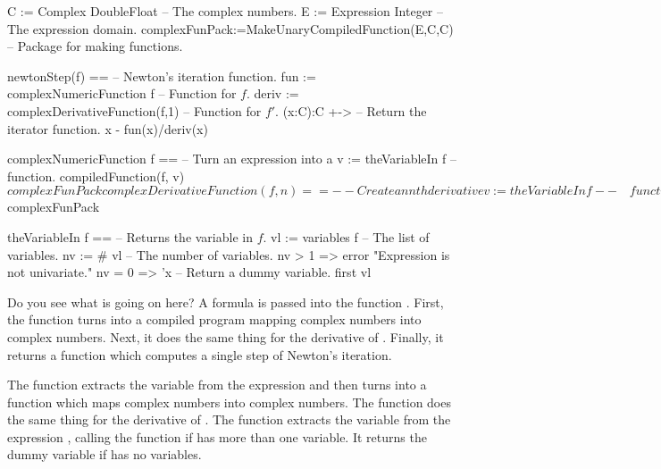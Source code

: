 \begin{xmpLines}
C := Complex DoubleFloat                             -- The complex numbers.
E := Expression Integer                              -- The expression domain.
complexFunPack:=MakeUnaryCompiledFunction(E,C,C)     -- Package for making functions.

newtonStep(f) ==                                     -- Newton's iteration function.
  fun  := complexNumericFunction f                   -- Function for $f$.
  deriv := complexDerivativeFunction(f,1)            -- Function for $f'$.
  (x:C):C +->                                        -- Return the iterator function.
    x - fun(x)/deriv(x)

complexNumericFunction f ==                          -- Turn an expression  into a
  v := theVariableIn f                               -- \quad{}function.
  compiledFunction(f, v)$complexFunPack

complexDerivativeFunction(f,n) ==                    -- Create an nth derivative
  v := theVariableIn f                               -- \quad{}function.
  df := D(f,v,n)
  compiledFunction(df, v)$complexFunPack

theVariableIn f ==                                   -- Returns the variable in $f$.
  vl := variables f                                  -- The list of variables.
  nv := # vl                                         -- The number of variables.
  nv > 1 => error "Expression is not univariate."
  nv = 0 => 'x                                       -- Return a dummy variable.
  first vl
\end{xmpLines}

Do you see what is going on here?
A formula  is passed into the function .
First, the function turns  into a compiled program mapping
complex numbers into complex numbers.  Next, it does the same thing
for the derivative of .  Finally, it returns a function which
computes a single step of Newton's iteration.

The function  extracts the variable
from the expression  and then turns  into a function
which maps complex numbers into complex numbers. The function
 does the same thing for the
derivative of .  The function 
extracts the variable from the expression , calling the function
 if  has more than one variable.
It returns the dummy variable  if  has no variables.

